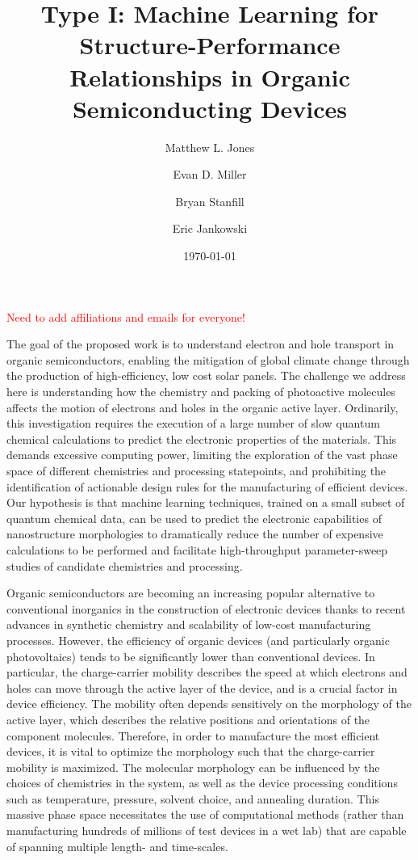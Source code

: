 \documentclass[12pt]{article}
\title{Type I: Machine Learning for Structure-Performance Relationships in Organic Semiconducting Devices}
\author{Matthew L. Jones}
\author{Evan D. Miller}
\author{Bryan Stanfill}
\author{Eric Jankowski}
\date{\today}
\begin{document}
\maketitle

\textcolor{red}{Need to add affiliations and emails for everyone!}



The goal of the proposed work is to understand electron and hole transport in organic semiconductors, enabling the mitigation of global climate change through the production of high-efficiency, low cost solar panels. 
The challenge we address here is understanding how the chemistry and packing of photoactive molecules affects the motion of electrons and holes in the organic active layer.
Ordinarily, this investigation requires the execution of a large number of slow quantum chemical calculations to predict the electronic properties of the materials.
This demands excessive computing power, limiting the exploration of the vast phase space of different chemistries and processing statepoints, and prohibiting the identification of actionable design rules for the manufacturing of efficient devices.
Our hypothesis is that machine learning techniques, trained on a small subset of quantum chemical data, can be used to predict the electronic capabilities of nanostructure morphologies to dramatically reduce the number of expensive calculations to be performed and facilitate high-throughput parameter-sweep studies of candidate chemistries and processing.


Organic semiconductors are becoming an increasing popular alternative to conventional inorganics in the construction of electronic devices\cite{Tsumura1986,Friend1999,Sariciftci1992} thanks to recent advances in synthetic chemistry and scalability of low-cost manufacturing processes.
However, the efficiency of organic devices (and particularly organic photovoltaics) tends to be significantly lower than conventional devices.
In particular, the charge-carrier mobility describes the speed at which electrons and holes can move through the active layer of the device, and is a crucial factor in device efficiency\cite{Sirringhaus2014}.
The mobility often depends sensitively on the morphology of the active layer, which describes the relative positions and orientations of the component molecules.
Therefore, in order to manufacture the most efficient devices, it is vital to optimize the morphology such that the charge-carrier mobility is maximized.
The molecular morphology can be influenced by the choices of chemistries in the system, as well as the device processing conditions such as temperature, pressure, solvent choice, and annealing duration\cite{Noriega2013}.
This massive phase space necessitates the use of computational methods (rather than manufacturing hundreds of millions of test devices in a wet lab) that are capable of spanning multiple length- and time-scales.
\end{document}
